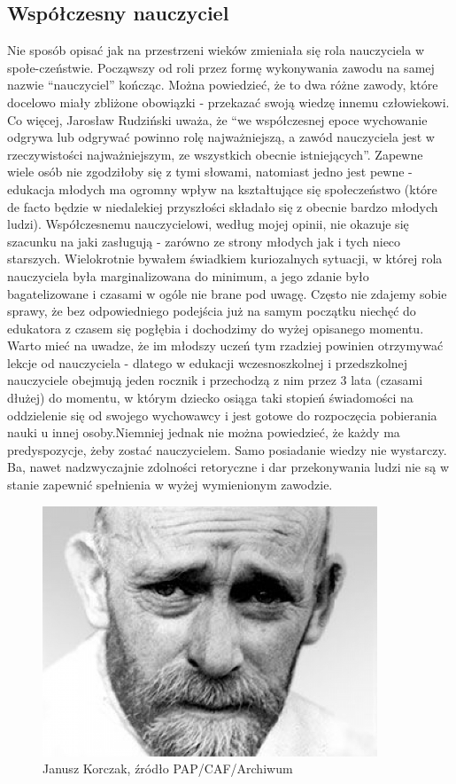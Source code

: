\documentclass{article}
\begin{document}
	\subsection{Współczesny nauczyciel}
	
	Nie sposób opisać jak na przestrzeni wieków zmieniała się rola nauczyciela w społe-czeństwie. Począwszy od roli przez formę wykonywania zawodu na samej nazwie “nauczyciel” kończąc. Można powiedzieć, że to dwa różne zawody, które docelowo miały zbliżone obowiązki - przekazać swoją wiedzę innemu człowiekowi. Co więcej, Jarosław Rudziński uważa, że “we współczesnej epoce wychowanie odgrywa lub odgrywać powinno rolę najważniejszą, a zawód nauczyciela jest w rzeczywistości najważniejszym, ze wszystkich obecnie istniejących”. Zapewne wiele osób nie zgodziłoby się z tymi słowami, natomiast jedno jest pewne - edukacja młodych ma ogromny wpływ na kształtujące się społeczeństwo (które de facto będzie w niedalekiej przyszłości składało się z obecnie bardzo młodych ludzi). Współczesnemu nauczycielowi, według mojej opinii, nie okazuje się szacunku na jaki zasługują - zarówno ze strony młodych jak i tych nieco starszych. Wielokrotnie bywałem świadkiem kuriozalnych sytuacji, w której rola nauczyciela była marginalizowana do minimum, a jego zdanie było bagatelizowane i czasami w ogóle nie brane pod uwagę. Często nie zdajemy sobie sprawy, że bez odpowiedniego podejścia już na samym początku niechęć do edukatora z czasem się pogłębia i dochodzimy do wyżej opisanego momentu. Warto mieć na uwadze, że im młodszy uczeń tym rzadziej powinien otrzymywać lekcje od nauczyciela - dlatego w edukacji wczesnoszkolnej i przedszkolnej nauczyciele obejmują jeden rocznik i przechodzą z nim przez 3 lata (czasami dłużej) do momentu, w którym dziecko osiąga taki stopień świadomości na oddzielenie się od swojego wychowawcy i jest gotowe do rozpoczęcia pobierania nauki u innej osoby.Niemniej jednak nie można powiedzieć, że każdy ma predyspozycje, żeby zostać nauczycielem. Samo posiadanie wiedzy nie wystarczy. Ba, nawet nadzwyczajnie zdolności retoryczne i dar przekonywania ludzi nie są w stanie zapewnić spełnienia w wyżej wymienionym zawodzie. 
	\begin{figure}
		\centering
		\includegraphics[width=10cm]{korczak}
		\caption{Janusz Korczak, źródło PAP/CAF/Archiwum}
	\end{figure}
\end{document}
